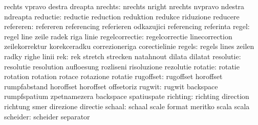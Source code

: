                            rechts                    vpravo
                           destra                    dreapta
                  nrechts: nrechts                   nright
                           nrechts                   nvpravo
                           ndestra                   ndreapta
                 reductie: reductie                  reduction
                           reduktion                 redukce
                           riduzione                 reducere
                refereren: refereren                 referencing
                           referieren                odkazujici
                           referencing               referinta %
                    regel: regel                     line
                           zeile                     radek
                           riga                      linie
           regelcorrectie: regelcorrectie            linecorrection
                           zeilekorrektur            korekceradku
                           correzioneriga            corectielinie
                   regels: regels                    lines
                           zeilen                    radky
                           righe                     linii
                      rek: rek                       stretch
                           strecken                  natahnout
                           dilata                    dilatat %
                resolutie: resolutie                 resolution
                           aufloesung                rozliseni
                           risoluzione               rezolutie
                  rotatie: rotatie                   rotation
                           rotation                  rotace
                           rotazione                 rotatie
                rugoffset: rugoffset                 horoffset
                           rumpfabstand              horoffset
                           horoffset                 offsetoriz %
                   rugwit: rugwit                    backspace
                           rumpfspatium              zpetnamezera
                           backspace                 spatiuspate %
                 richting: richting                  direction
                           richtung                  smer
                           direzione                 directie
                   schaal: schaal                    scale
                           format                    meritko
                           scala                     scala
                 scheider: scheider                  separator
